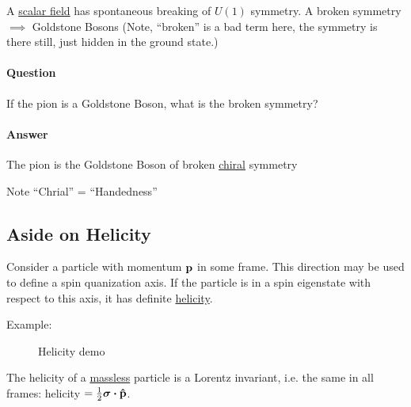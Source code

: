 A \underline{scalar field} has spontaneous breaking of $U(1)$ symmetry. A broken symmetry $\implies$ Goldstone Bosons (Note, ``broken'' is a bad term here, the symmetry is there still, just hidden in the ground state.)

\paragraph{Question} If the pion is a Goldstone Boson, what is the broken symmetry?

\paragraph{Answer} The pion is the Goldstone Boson of broken \underline{chiral} symmetry

Note ``Chrial'' = ``Handedness''

\subsection{Aside on Helicity}
Consider a particle with momentum $\vb{p}$ in some frame. This direction may be used to define a spin quanization axis. If the particle is in a spin eigenstate with respect to this axis, it has definite \underline{helicity}.

Example:
\begin{figure}[H]
  \centering
  \caption{Helicity demo}
  \label{fig:helicity}
\end{figure}
The helicity of a \underline{massless} particle is a Lorentz invariant, i.e. the same in all frames: helicity $= \frac12\bm\sigma\vdot\vu{p}$.

